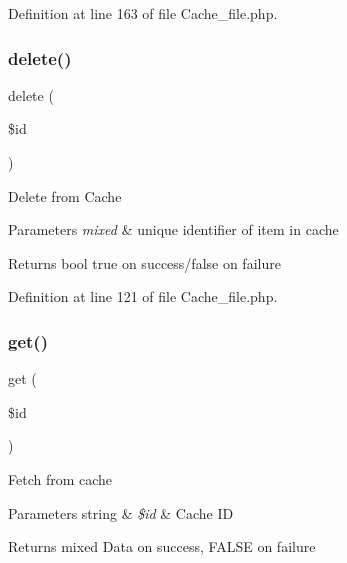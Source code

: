 Definition at line 163 of file Cache\+\_\+file.\+php.

\mbox{\label{class_c_i___cache__file_a2f8258add505482d7f00ea26493a5723}} 
\subsubsection{\texorpdfstring{delete()}{delete()}}
{\footnotesize\ttfamily delete (\begin{DoxyParamCaption}\item[{}]{\$id }\end{DoxyParamCaption})}

Delete from Cache


\begin{DoxyParams}{Parameters}
{\em mixed} & unique identifier of item in cache \\
\hline
\end{DoxyParams}
\begin{DoxyReturn}{Returns}
bool true on success/false on failure 
\end{DoxyReturn}


Definition at line 121 of file Cache\+\_\+file.\+php.

\mbox{\label{class_c_i___cache__file_a50e3bfb586b2f42932a6a93f3fbb0828}} 
\subsubsection{\texorpdfstring{get()}{get()}}
{\footnotesize\ttfamily get (\begin{DoxyParamCaption}\item[{}]{\$id }\end{DoxyParamCaption})}

Fetch from cache


\begin{DoxyParams}[1]{Parameters}
string & {\em \$id} & Cache ID \\
\hline
\end{DoxyParams}
\begin{DoxyReturn}{Returns}
mixed Data on success, F\+A\+L\+SE on failure 
\end{DoxyReturn}


